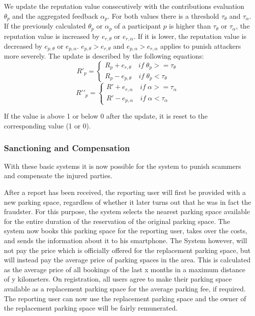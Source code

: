\documentclass[
a4paper,     %
titlepage,   %
14pt         %
]{scrartcl}  %
\theoremstyle{mystyle}
\begin{document}
We update the reputation value consecutively with the contributions evaluation $\theta_p$  and the aggregated feedback $\alpha_p$. For both values there is a threshold $\tau_\theta$ and $\tau_\alpha$. If the previously calculated $\theta_p$ or $\alpha_p$ of a participant $p$ is higher than $\tau_\theta$ or $\tau_\alpha$, the reputation value is increased by $e_{r,\theta}$ or $e_{r,\alpha}$. If it is lower, the reputation value is decreased by $e_{p,\theta}$ or $e_{p,\alpha}$. $e_{p,\theta}>e_{r,\theta}$ and $e_{p,\alpha}>e_{r,\alpha}$ applies to punish attackers more severely. The update is described by the following equations: 
\begin{equation}
  R\prime_p = \begin{cases} R_p + e_{r,\theta}\quad if\; \theta_p>=\tau_\theta \\ R_p - e_{p,\theta}\quad if\; \theta_p<\tau_\theta \end{cases}
\end{equation}
\begin{equation}
  R\prime\prime_p = \begin{cases} R\prime + e_{r,\alpha}\quad if\; \alpha>=\tau_\alpha \\ R\prime - e_{p,\alpha}\quad if\; \alpha<\tau_\alpha \end{cases}
\end{equation}

If the value is above 1 or below 0 after the update, it is reset to the corresponding value (1 or 0).

\subsubsection{Sanctioning and Compensation} With these basic systems it is now possible for the system to punish scammers and compensate the injured parties. 

After a report has been received, the reporting user will first be provided with a new parking space, regardless of whether it later turns out that he was in fact the fraudster. For this purpose, the system selects the nearest parking space available for the entire duration of the reservation of the original parking space. The system now books this parking space for the reporting user, takes over the costs, and sends the information about it to his smartphone. The System however, will not pay the price which is officially offered for the replacement parking space, but will instead pay the average price of parking spaces in the area. This is calculated as the average price of all bookings of the last x months in a maximum distance of y kilometers. On registration, all users agree to make their parking space available as a replacement parking space for the average parking fee, if required. The reporting user can now use the replacement parking space and the owner of the replacement parking space will be fairly remunerated.
\end{document}
